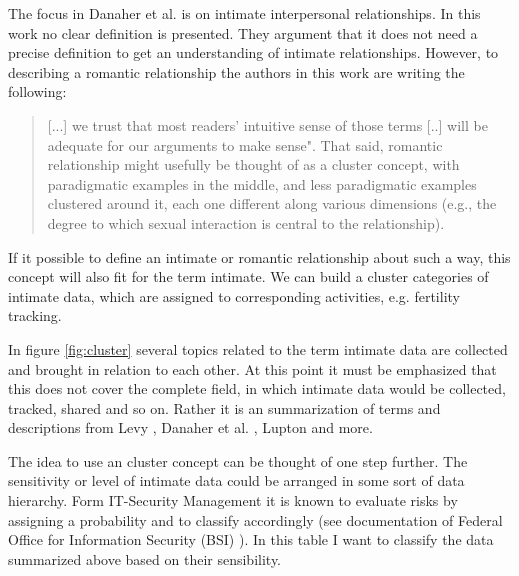 The focus in Danaher et al. \cite{doi:10.1080/15265161.2017.1409823} is on intimate interpersonal relationships. In this work no clear definition is presented. They argument that it does not need a precise definition to get an understanding of intimate relationships. However, to describing a romantic relationship the authors in this work are writing the following:

\begin{quote}
	[...] we trust that most readers' intuitive sense of those terms [..] will be adequate for our arguments to make sense". 
	That said, romantic relationship might usefully be thought of as a cluster concept, with paradigmatic examples in the middle, and less paradigmatic examples clustered around it, each one different along various dimensions (e.g., the degree to which sexual interaction is central to the relationship).
\end{quote}

If it possible to define an intimate or romantic relationship about such a way, this concept will also fit for the term intimate. We can build a cluster categories of intimate data, which are assigned to corresponding activities, e.g. fertility tracking.

In figure \ref{fig:cluster} several topics related to the term intimate data are collected and brought in relation to each other. At this point it must be emphasized that this does not cover the complete field, in which intimate data would be collected, tracked, shared and so on. Rather it is an summarization of terms and descriptions from Levy \cite{levy2014intimate}, Danaher et al. \cite{doi:10.1080/15265161.2017.1409823}, Lupton \cite{doi:10.1080/13691058.2014.920528} and more. 

The idea to use an cluster concept can be thought of one step further. The sensitivity or level of intimate data could be arranged in some sort of data hierarchy. Form IT-Security Management it is known to evaluate risks by assigning a probability and to classify accordingly (see documentation of Federal Office for Information Security (BSI) \cite{bsi}). In this table I want to classify the data summarized above based on their sensibility.

